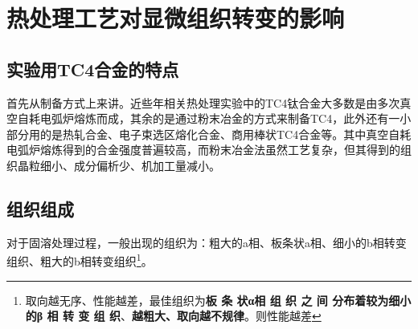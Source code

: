 \documentclass[
class = book,
zihao = -4,
font = noto,
paper = a4paper,
openany
]{easybook}
\begin{document}
%
%
\chapter{热处理工艺对显微组织转变的影响}
\section{实验用TC4合金的特点}
首先从制备方式上来讲。近些年相关热处理实验中的TC4钛合金大多数是由{多次真空自耗电弧炉熔炼}\cite{renchiqiangGurongshixiaoduiTC4taihejinxianweizuzhihelixuexingnengdeyingxiang2022,ranxingGurongwenduduiTi6Al4VELItaihejinxianweizuzhijixingnengdeyingxiang2021,lilouGurongshixiaoduiTC4hejinzuzhiyujixiexingnengdeyingxiang2014,jingranGurongshixiaoduiTC4hejinzuzhiyuxingnengdeyingxiang2018}而成，其余的是通过粉末冶金\cite{zhanghaoyinGurongShixiaoduiTC4taihejinzuzhihelixuexingnengdeyingxiang2014,xujianGurongshixiaogongyiduiTC4taihejinzuzhijixingnengdeyingxiang2014}的方式来制备TC4，此外还有一小部分用的是热轧合金\cite{LiuWanYingBuTongReChuLiGongYiDuiTi6Al4VTaiHeJinWeiGuanJieGouHeLiXueXingNengYingXiangYingWen2017}、电子束选区熔化合金\cite{leijunleDianzishuxuanquronghuachengxingTC4hejinxianweizuzhiyuxingnengdeyanjiujinzhan2022}、商用棒状TC4合金\cite{luyuanyuanShixiaochuliduiTC4taihejinweiguanzuzhihelixuexingnengdeyingxiang2019,baoxuechunRechuligongyiduiTC4taihejinzuzhihelixuexingnengdeyingxiang2019}等。其中真空自耗电弧炉熔炼得到的合金强度普遍较高，而粉末冶金法虽然工艺复杂，但其得到的组织晶粒细小、成分偏析少、机加工量减小。




\section{组织组成}
对于固溶处理过程，一般出现的组织为：粗大的a相、板条状a相、细小的b相转变组织、粗大的b相转变组织\footnote{取向越无序、性能越差，最佳组织为\textbf{板 条 状α相 组 织 之 间 分布着较为细小 的β 相 转 变 组 织}、\textbf{越粗大、取向越不规律}。则性能越差}。\cite{zhanghaoyinGurongShixiaoduiTC4taihejinzuzhihelixuexingnengdeyingxiang2014}
\end{document}
